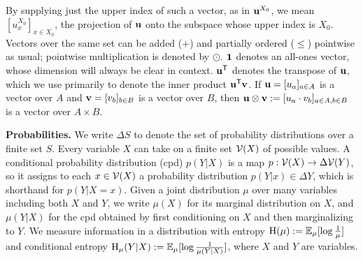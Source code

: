 \documentclass[twoside]{article}
\begin{document}
By supplying just the upper index of such a vector, as in $\mathbf{u}^{X_0}$,
we mean $[u^{X_0}_x]_{x \in {X_0}}$, the projection of $\mathbf{u}$ onto the subspace whose upper index is $X_0$. 
Vectors over the same set can be added (+) and partially ordered ($\le$) pointwise as usual; pointwise multiplication is denoted by $\odot$.  
$\mathbf{1}$ denotes an all-ones vector, whose dimension will always be clear in context.
$\mathbf{u}^{\sf T}$ denotes the transpose of $\mathbf{u}$, which we use primarily to denote the inner product $\mathbf{u}^{\sf T} \mathbf{v}$.
If $\mathbf{u} = [u_a]_{a \in A}$ is a vector over $A$ and $\mathbf{v} = [v_b]_{b \in B}$ is a vector over $B$, then $\mathbf{u} \mathbin{\otimes} \mathbf{v} := [ u_a \cdot v_b ]_{a \in A, b \in B}$ is a vector over $A \times B$.


\textbf{Probabilities.}
We write $\Delta S$ to denote the set of probability distributions over a finite set $S$.
Every variable $X$ can take on a finite set $\mathcal V(X)$ of possible values. 
A conditional probability distribution (cpd) $p(Y|X)$ is a map 
$p : \mathcal V(X) \to \Delta \mathcal V(Y)$, so it assigns to each $x \in \mathcal V(X)$ a
probability distribution $p(Y|x) \in \Delta Y$, which is shorthand for $p(Y|X\!\!=\!x)$.
Given a joint distribution $\mu$ over many variables including both $X$ and $Y$, 
we write $\mu(X)$ for its marginal distribution on $X$,
and $\mu(Y|X)$ for the cpd obtained by first conditioning on $X$ and then marginalizing to $Y$. 
We measure information in a distribution with entropy $\operatorname{\mathrm{H}}(\mu) := \operatorname*{\mathbb{E}}_{\mu} [\log \frac1\mu]$ and conditional entropy $\operatorname{\mathrm{H}}_\mu(Y|X) := \operatorname*{\mathbb{E}}_\mu[\log\frac1{\mu(Y|X)}]$, where $X$ and $Y$ are variables.
\end{document}
